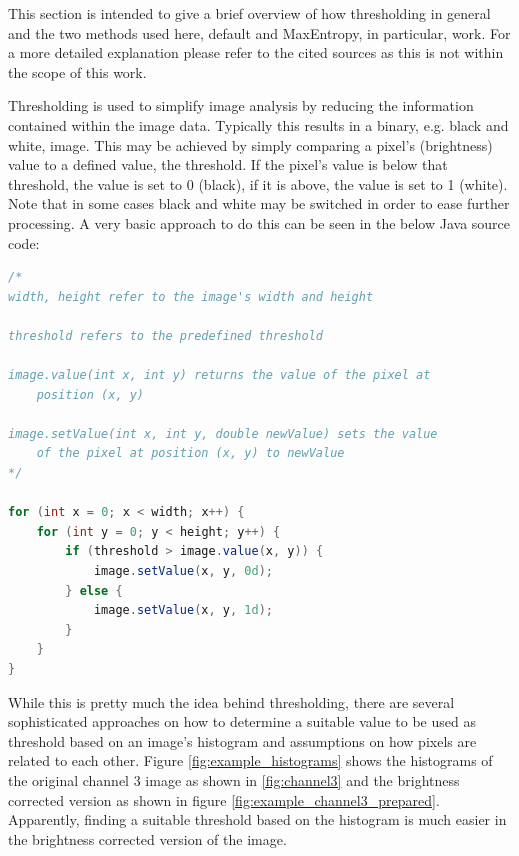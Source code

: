 \documentclass[a4paper, 12pt, twoside]{article}
\begin{document}
This section is intended to give a brief overview of how thresholding in general
and the two methods used here, default and MaxEntropy, in particular, work. For
a more detailed explanation please refer to the cited sources as this is not
within the scope of this work.

Thresholding is used to simplify image analysis by reducing the information
contained within the image data. Typically this results in a binary, e.g. black
and white, image. This may be achieved by simply comparing a pixel's
(brightness) value to a defined value, the threshold. If the pixel's value is
below that threshold, the value is set to 0 (black), if it is above, the value
is set to 1 (white). Note that in some cases black and white may be switched in
order to ease further processing. A very basic approach to do this can be seen
in the below Java source code:

\begin{lstlisting}[language=Java, caption=Basic thresholding algorithm]
/*
width, height refer to the image's width and height

threshold refers to the predefined threshold

image.value(int x, int y) returns the value of the pixel at 
	position (x, y)

image.setValue(int x, int y, double newValue) sets the value 
	of the pixel at position (x, y) to newValue
*/

for (int x = 0; x < width; x++) {
	for (int y = 0; y < height; y++) {
		if (threshold > image.value(x, y)) {
			image.setValue(x, y, 0d);
		} else {
			image.setValue(x, y, 1d);
		}
	}
}
\end{lstlisting}

While this is pretty much the idea behind thresholding, there are several
sophisticated approaches on how to determine a suitable value to be used as
threshold based on an image's histogram and assumptions on how pixels are
related to each other. Figure \ref{fig:example_histograms} shows the histograms
of the original channel 3 image as shown in \ref{fig:channel3} and the
brightness corrected version as shown in figure
\ref{fig:example_channel3_prepared}. Apparently, finding a suitable threshold
based on the histogram is much easier in the brightness corrected version of
the image.
\end{document}
